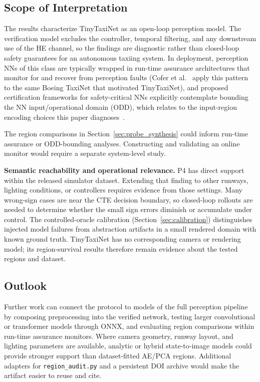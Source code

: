 \documentclass[twocolumn,smallextended,runningheads]{svjour3}
\begin{document}
\subsection{Scope of Interpretation}

The results characterize TinyTaxiNet as an open-loop perception model. The verification model excludes the controller, temporal filtering, and any downstream use of the HE channel, so the findings are diagnostic rather than closed-loop safety guarantees for an autonomous taxiing system. In deployment, perception NNs of this class are typically wrapped in run-time assurance architectures that monitor for and recover from perception faults (Cofer et al.~\cite{cofer2020rta} apply this pattern to the same Boeing TaxiNet that motivated TinyTaxiNet), and proposed certification frameworks for safety-critical NNs explicitly contemplate bounding the NN input/operational domain (ODD), which relates to the input-region encoding choices this paper diagnoses~\cite{codann2020}.

The region comparisons in Section~\ref{sec:probe_synthesis} could inform run-time assurance or ODD-bounding analyses. Constructing and validating an online monitor would require a separate system-level study.

\textbf{Semantic reachability and operational relevance.} P4 has direct support within the released simulator dataset. Extending that finding to other runways, lighting conditions, or controllers requires evidence from those settings. Many wrong-sign cases are near the CTE decision boundary, so closed-loop rollouts are needed to determine whether the small sign errors diminish or accumulate under control. The controlled-oracle calibration (Section~\ref{sec:calibration}) distinguishes injected model failures from abstraction artifacts in a small rendered domain with known ground truth. TinyTaxiNet has no corresponding camera or rendering model; its region-survival results therefore remain evidence about the tested regions and dataset.

\subsection{Outlook}

Further work can connect the protocol to models of the full perception pipeline by composing preprocessing into the verified network, testing larger convolutional or transformer models through ONNX, and evaluating region comparisons within run-time assurance monitors. Where camera geometry, runway layout, and lighting parameters are available, analytic or hybrid state-to-image models could provide stronger support than dataset-fitted AE/PCA regions. Additional adapters for \texttt{region\_audit.py} and a persistent DOI archive would make the artifact easier to reuse and cite.
\end{document}

